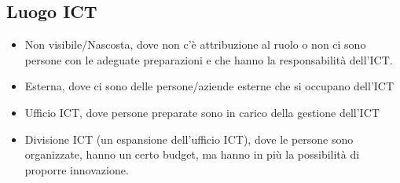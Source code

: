 \subsection{Luogo ICT}
\begin{itemize}
	\item Non visibile/Nascosta, dove non c'è attribuzione al ruolo o non ci sono persone con le adeguate preparazioni e che hanno la responsabilità dell'ICT.
	\item Esterna, dove ci sono delle persone/aziende esterne che si occupano dell'ICT
	\item Ufficio ICT, dove persone preparate sono in carico della gestione dell'ICT
	\item Divisione ICT (un espansione dell'ufficio ICT), dove le persone sono organizzate, hanno un certo budget, ma hanno in più la possibilità di proporre innovazione.
\end{itemize}
